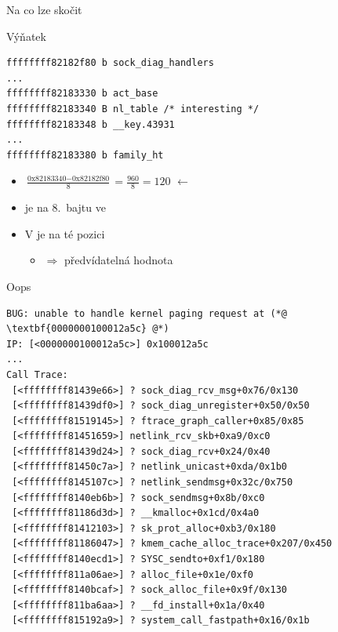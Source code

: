 \begin{frame}[fragile]{Na co lze skočit}

  \begin{block}{Výňatek }
    \begin{lstlisting}
ffffffff82182f80 b sock_diag_handlers
...
ffffffff82183330 b act_base
ffffffff82183340 B nl_table /* interesting */
ffffffff82183348 b __key.43931
...
ffffffff82183380 b family_ht
    \end{lstlisting}
  \end{block}

  \medskip

  \begin{itemize}
    \item \code{hndl = sock_diag_handlers[}$\frac{\text{0x82183340} -
      \text{0x82182f80}}{8} = \frac{960}{8} = 120$\code{]} $\leftarrow$

    \pause

    \item {} je na 8.\ bajtu ve 

    \pause

    \item V  je na té pozici 
    \begin{itemize}
      \item {} $\Rightarrow$ předvídatelná hodnota
    \end{itemize}
  \end{itemize}

\end{frame}

\begin{frame}[fragile]{Oops}

\begin{lstlisting}
BUG: unable to handle kernel paging request at (*@ \textbf{0000000100012a5c} @*)
IP: [<0000000100012a5c>] 0x100012a5c
...
Call Trace:
 [<ffffffff81439e66>] ? sock_diag_rcv_msg+0x76/0x130
 [<ffffffff81439df0>] ? sock_diag_unregister+0x50/0x50
 [<ffffffff81519145>] ? ftrace_graph_caller+0x85/0x85
 [<ffffffff81451659>] netlink_rcv_skb+0xa9/0xc0
 [<ffffffff81439d24>] ? sock_diag_rcv+0x24/0x40
 [<ffffffff81450c7a>] ? netlink_unicast+0xda/0x1b0
 [<ffffffff8145107c>] ? netlink_sendmsg+0x32c/0x750
 [<ffffffff8140eb6b>] ? sock_sendmsg+0x8b/0xc0
 [<ffffffff81186d3d>] ? __kmalloc+0x1cd/0x4a0
 [<ffffffff81412103>] ? sk_prot_alloc+0xb3/0x180
 [<ffffffff81186047>] ? kmem_cache_alloc_trace+0x207/0x450
 [<ffffffff8140ecd1>] ? SYSC_sendto+0xf1/0x180
 [<ffffffff811a06ae>] ? alloc_file+0x1e/0xf0
 [<ffffffff8140bcaf>] ? sock_alloc_file+0x9f/0x130
 [<ffffffff811ba6aa>] ? __fd_install+0x1a/0x40
 [<ffffffff815192a9>] ? system_call_fastpath+0x16/0x1b
\end{lstlisting}

\end{frame}

